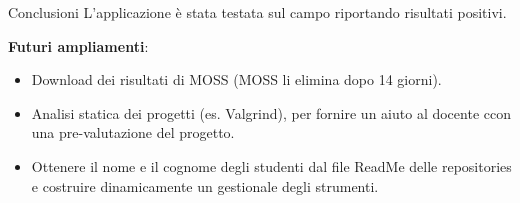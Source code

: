 \documentclass{beamer}
\begin{document}
	
	\begin{frame}{Conclusioni}
		L'applicazione è stata testata sul campo riportando risultati positivi.
		
		\vspace{0.5cm}
		\textbf{Futuri ampliamenti}:
		\begin{itemize}
			\item Download dei risultati di MOSS (MOSS li elimina dopo 14 giorni).
			\item Analisi statica dei progetti (es. Valgrind), per fornire un aiuto al docente ccon una pre-valutazione del progetto.
			\item Ottenere il nome e il cognome degli studenti dal file ReadMe delle repositories e costruire dinamicamente un gestionale degli strumenti.
		\end{itemize}
	\end{frame}
\end{document}
